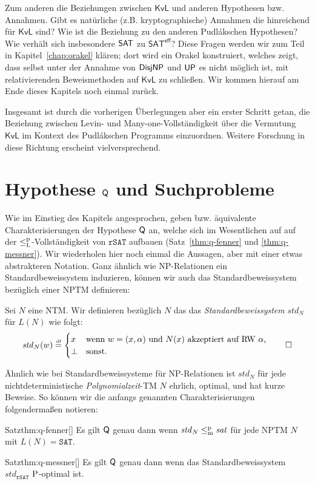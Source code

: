 Zum anderen die Beziehungen zwischen $\mathsf{KvL}$ und anderen Hypothesen bzw. Annahmen.
Gibt es natürliche (z.B. kryptographische) Annahmen die hinreichend für $\mathsf{KvL}$ sind? Wie ist die Beziehung zu den anderen Pudlákschen Hypothesen? Wie verhält sich insbesondere $\hSAT$ zu $\mathsf{SAT^{eff}}$? 
Diese Fragen werden wir zum Teil in Kapitel~\ref{chap:orakel} klären; dort wird ein Orakel konstruiert, welches zeigt, dass selbst unter der Annahme von $\hDisjNP$ und $\hUP$ es nicht möglich ist, mit relativierenden Beweismethoden auf $\mathsf{KvL}$ zu schließen.
Wir kommen hierauf am Ende dieses Kapitels noch einmal zurück.

Insgesamt ist durch die vorherigen Überlegungen aber ein erster Schritt getan, die Beziehung zwischen Levin- und Many-one-Vollständigkeit über die Vermutung $\mathsf{KvL}$ im Kontext des Pudlákschen Programms einzuordnen.
Weitere Forschung in diese Richtung erscheint vielversprechend.

\section{Hypothese $\hQ$ und Suchprobleme}\label{sec:q-vs-search}

Wie im Einstieg des Kapitels angesprochen, geben \textcite{fenner_inverting_2003} bzw. \textcite{kobler_is_2000} äquivalente Charakterisierungen der Hypothese $\hQ$ an, welche sich im Wesentlichen auf auf der $\leqlp$-Vollständigkeit von $\mathtt{rSAT}$ aufbauen (Satz~\ref{thm:q-fenner} und \ref{thm:q-messner}).
Wir wiederholen hier noch einmal die Aussagen, aber mit einer etwas abstrakteren Notation.
Ganz ähnlich wie NP-Relationen ein Standardbeweissystem induzieren, können wir auch das Standardbeweissystem bezüglich einer NPTM definieren:
\begin{definition}
    Sei $N$ eine NTM. Wir definieren bezüglich $N$ das das \emph{Standardbeweissystem} $\mathit{std}_N$ für $L(N)$ wie folgt:
    \[ \mathit{std}_N(w) \defeq \begin{cases} x & \text{wenn $w=(x,\alpha)$ und $N(x)$ akzeptiert auf RW $\alpha$,}\\
    \bot & \text{sonst}.\end{cases} \qedhere \] 
\end{definition}
Ähnlich wie bei Standardbeweissysteme für NP-Relationen ist $\mathit{std}_N$ für jede nichtdeterministische \emph{Polynomialzeit}-TM $N$ ehrlich, optimal, und hat kurze Beweise.
So können wir die anfangs genannten Charakterisierungen folgendermaßen notieren:
\begin{reptheorem}{Satz}{thm:q-fenner}[\cite{fenner_inverting_2003}]
    Es gilt $\hQ$ genau dann wenn $\mathit{std}_N\leqmp\mathit{sat}$ für jede NPTM $N$ mit $L(N)=\mathtt{SAT}$.
\end{reptheorem}
\begin{reptheorem}{Satz}{thm:q-messner}[\cite{kobler_is_2000}]
    Es gilt $\hQ$ genau dann wenn das Standardbeweissystem $\mathit{std}_\mathtt{rSAT}$ $\P$-optimal ist.
\end{reptheorem}


